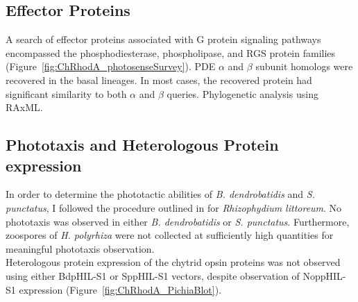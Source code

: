 \subsection*{Effector Proteins}
A search of effector proteins associated with G protein signaling pathways encompassed the phosphodiesterase, phospholipase, and RGS protein families (Figure~\ref{fig:ChRhodA_photosenseSurvey}). PDE $\alpha$ and $\beta$ subunit homologs were recovered in the basal lineages. In most cases, the recovered protein had significant similarity to both $\alpha$ and $\beta$ queries. Phylogenetic analysis using RAxML.\\ 

\subsection*{Phototaxis and Heterologous Protein expression}
In order to determine the phototactic abilities of \textit{B. dendrobatidis} and \textit{S. punctatus}, I followed the procedure outlined in \cite{Muehlstein1987} for \textit{Rhizophydium littoreum}. No phototaxis was observed in either \textit{B. dendrobatidis} or \textit{S. punctatus}. Furthermore, zoospores of \textit{H. polyrhiza} were not collected at sufficiently high quantities for meaningful phototaxis observation.\\
\indent Heterologous protein expression of the chytrid opsin proteins was not observed using either BdpHIL-S1 or SppHIL-S1 vectors, despite observation of NoppHIL-S1 expression (Figure~\ref{fig:ChRhodA_PichiaBlot}).\\ 

